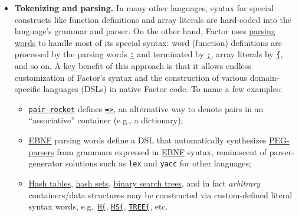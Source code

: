 \documentclass[
]{article}
\providecommand{\tightlist}{%
  \setlength{\itemsep}{0pt}\setlength{\parskip}{0pt}}
\begin{document}
\begin{itemize}
\item
  \textbf{Tokenizing and parsing.} In many other languages, syntax for
  special constructs like function definitions and array literals are
  hard-coded into the language's grammar and parser. On the other hand,
  Factor uses
  \href{https://docs.factorcode.org/content/article-parsing-words.html}{parsing
  words} to handle most of its special syntax: word (function)
  definitions are processed by the parsing words
  \href{https://docs.factorcode.org/content/word-__colon__,syntax.html}{\texttt{:}}
  and terminated by
  \href{https://docs.factorcode.org/content/word-\%3B\%2Csyntax.html}{\texttt{;}},
  array literals by
  \href{https://docs.factorcode.org/content/word-\%7B,syntax.html}{\texttt{\{}},
  and so on. A key benefit of this approach is that it allows endless
  customization of Factor's syntax and the construction of various
  domain-specific languages (DSLs) in native Factor code. To name a few
  examples:

  \begin{itemize}
  \tightlist
  \item
    \href{https://docs.factorcode.org/content/vocab-pair-rocket.html}{\texttt{pair-rocket}}
    defines
    \href{https://docs.factorcode.org/content/word-\%3D__gt__\%2Cpair-rocket.html}{\texttt{=\textgreater{}}},
    an alternative way to denote pairs in an ``associative'' container
    (e.g., a dictionary);
  \item
    \href{https://docs.factorcode.org/content/article-peg.ebnf.html}{EBNF}
    parsing words define a DSL that automatically synthesizes
    \href{https://en.wikipedia.org/wiki/Parsing_expression_grammar}{PEG-parsers}
    from grammars expressed in
    \href{https://en.wikipedia.org/wiki/Extended_Backus\%E2\%80\%93Naur_form}{EBNF}
    syntax, reminiscent of parser-generator solutions such as
    \texttt{lex} and \texttt{yacc} for other languages;
  \item
    \href{https://docs.factorcode.org/content/article-syntax-hashtables.html}{Hash
    tables},
    \href{https://docs.factorcode.org/content/article-hash-sets.html}{hash
    sets},
    \href{https://docs.factorcode.org/content/article-trees.html}{binary
    search trees}, and in fact \emph{arbitrary} containers/data
    structures may be constructed via custom-defined literal syntax
    words,
    e.g.~\href{https://docs.factorcode.org/content/word-H\%7B,syntax.html}{\texttt{H\{}},
    \href{https://docs.factorcode.org/content/word-HS\%7B,syntax.html}{\texttt{HS\{}},
    \href{https://docs.factorcode.org/content/word-TREE\%7B,trees.html}{\texttt{TREE\{}},
    etc.
  \end{itemize}


\end{itemize}
\end{document}
